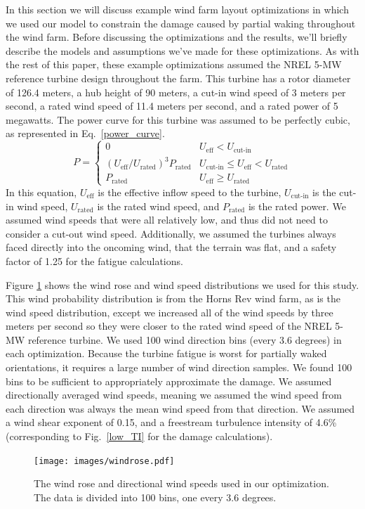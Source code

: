 \documentclass[11pt,letterpaper]{article}
\begin{document}
In this section we will discuss example wind farm layout optimizations in which we used our model to constrain the damage caused by partial waking throughout the wind farm. Before discussing the optimizations and the results, we'll briefly describe the models and assumptions we've made for these optimizations. As with the rest of this paper, these example optimizations assumed the NREL 5-MW reference turbine design throughout the farm. This turbine has a rotor diameter of 126.4 meters, a hub height of 90 meters, a cut-in wind speed of 3 meters per second, a rated wind speed of 11.4 meters per second, and a rated power of 5 megawatts. The power curve for this turbine was assumed to be perfectly cubic, as represented in Eq.~\ref{power_curve}. 
% 
\begin{equation}
    P = \begin{cases} 
      0 &  U_\text{eff} < U_\text{cut-in} \\
      (U_\text{eff}/U_\text{rated})^3 P_\text{rated} &  U_\text{cut-in} \leq U_\text{eff} < U_\text{rated}\\
      P_\text{rated} & U_\text{eff} \geq U_\text{rated}
   \end{cases}
   \label{power_curve}
\end{equation}
% 
In this equation, $U_\text{eff}$ is the effective inflow speed to the turbine, $U_\text{cut-in}$ is the cut-in wind speed, $U_\text{rated}$ is the rated wind speed, and $P_\text{rated}$ is the rated power.
We assumed wind speeds that were all relatively low, and thus did not need to consider a cut-out wind speed.
Additionally, we assumed the turbines always faced directly into the oncoming wind, that the terrain was flat, and a safety factor of 1.25 for the fatigue calculations.

Figure \ref{windrose} shows the wind rose and wind speed distributions we used for this study. This wind probability distribution is from the Horns Rev wind farm, as is the wind speed distribution, except we increased all of the wind speeds by three meters per second so they were closer to the rated wind speed of the NREL 5-MW reference turbine. We used 100 wind direction bins (every 3.6 degrees) in each optimization. Because the turbine fatigue is worst for partially waked orientations, it requires a large number of wind direction samples. We found 100 bins to be sufficient to appropriately approximate the damage. We assumed directionally averaged wind speeds, meaning we assumed the wind speed from each direction was always the mean wind speed from that direction. We assumed a wind shear exponent of 0.15, and a freestream turbulence intensity of 4.6\% (corresponding to Fig.~\ref{low_TI} for the damage calculations).
% 
\begin{figure}
    \centering
    \texttt{[image: images/windrose.pdf]}
    \caption{The wind rose and directional wind speeds used in our optimization. The data is divided into 100 bins, one every 3.6 degrees.}
    \label{windrose}
\end{figure}
\end{document}
